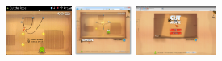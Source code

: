 \documentclass{acm_proc_article-sp}
\newcommand{\thumbheight}{16mm}
\newenvironment{thumbsequence}{}{\makebox[4mm]{}}
\begin{document}
\begin{figure}
\begin{centering}
\begin{thumbsequence}
		\includegraphics[height=\thumbheight]{resources/ropes/looseduplicate2.jpg}
		\includegraphics[height=\thumbheight]{resources/ropes/looseduplicate3.png}
		\includegraphics[height=\thumbheight]{resources/ropes/looseduplicate4.png}

\end{thumbsequence}
\end{centering}
\end{figure}
\end{document}
